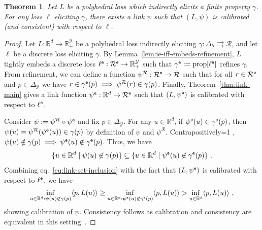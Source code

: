 \documentclass[11pt]{article}
\newcommand{\Comments}{1}
\newcommand{\mytodo}[2]{\ifnum\Comments=1%
  \todo[linecolor=#1!80!black,backgroundcolor=#1,bordercolor=#1!80!black]{#2}\fi}
\newcommand{\raft}[1]{\mytodo{green!20!white}{RF: #1}}
\newcommand{\reals}{\mathbb{R}}
\newcommand{\prop}[1]{\mathrm{prop}[#1]}
\newcommand{\simplex}{\Delta_\Y}
\newcommand{\R}{\mathcal{R}}
\newcommand{\Y}{\mathcal{Y}}
\newcommand{\inprod}[2]{\langle #1, #2 \rangle}%
\newcommand{\toto}{\rightrightarrows}
\newcommand{\emb}{{\tt e}}
\newtheorem{theorem}{Theorem}
\begin{document}
\begin{theorem}\label{thm:poly-ie-implies-consistent}
	Let $L$ be a polyhedral loss which indirectly elicits a finite property $\gamma$.
  For any loss $\ell$ eliciting $\gamma$, there exists a link $\psi$ such that $(L, \psi)$ is calibrated (and consistent) with respect to $\ell$.
\end{theorem}
\begin{proof}
	Let $L:\reals^d \to \reals^\Y_+$ be a polyhedral loss indirectly eliciting $\gamma: \simplex \toto \R$, and let $\ell$ be a discrete loss eliciting $\gamma$.
  By Lemma~\ref{lem:ie-iff-embeds-refinement}, $L$ tightly embeds a discrete loss $\ell^\emb:\R^\emb\to\reals^\Y_+$ such that $\gamma^\emb := \prop{\ell^\emb}$ refines $\gamma$.
  From refinement, we can define a function $\psi^\R: \R^\emb \to \R$ such that for all $r\in\R^\emb$ and $p\in\simplex$ we have $r\in\gamma^\emb(p) \implies \psi^\R(r) \in \gamma(p)$. 
  Finally, Theorem~\ref{thm:link-main} gives a link function $\psi^\emb : \reals^d \to \R^\emb$ such that $(L,\psi^\emb)$ is calibrated with respect to $\ell^\emb$.

	
  Consider $\psi := \psi^\R \circ \psi^\emb$ and fix $p\in\simplex$.
	For any $u\in\reals^d$, if $\psi^\emb(u) \in \gamma^\emb(p)$, then $\psi(u) = \psi^\R(\psi^\emb(u)) \in \gamma(p)$ by definition of $\psi$ and $\psi^\R$.
  Contrapositively\raft{You heard me},
  $\psi(u) \notin \gamma(p) \implies \psi^\emb(u) \notin \gamma^\emb(p)$.
  Thus, we have
  \begin{equation}
    \label{eq:link-set-inclusion}
    \{u\in\reals^d \mid \psi(u) \not \in \gamma(p) \} \subseteq \{u\in\reals^d \mid \psi^\emb(u) \not \in \gamma^\emb(p) \}~.
  \end{equation}
  Combining eq.~\eqref{eq:link-set-inclusion} with the fact that $(L,\psi^\emb)$ is calibrated with respect to $\ell^\emb$, we have
	\begin{align*}
\inf_{u\in\reals^d : \psi(u) \not \in \gamma(p)} \inprod{p}{L(u)} \geq	\inf_{u\in\reals^d : \psi^\emb(u) \not \in \gamma^\emb(p)} \inprod{p}{L(u)} > \inf_{u\in\reals^d}\inprod{p}{L(u)}~,
	\end{align*}
  showing calibration of $\psi$.
	Consistency follows as calibration and consistency are equivalent in this setting~\citep{ramaswamy2016convex}.
\end{proof}
\end{document}
